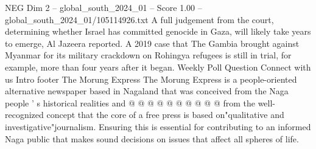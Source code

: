 \begin{textsample}{NEG Dim 2 – global\_south\_2024\_01 – Score 1.00 – global\_south\_2024\_01/105114926.txt}
A full judgement from the court, determining whether Israel has committed genocide in Gaza, will likely take years to emerge, Al Jazeera reported.
A 2019 case that The Gambia brought against Myanmar for its military crackdown on Rohingya refugees is still in trial, for example, more than four years after it began.
Weekly Poll Question Connect with us Intro footer The Morung Express The Morung Express is a people-oriented alternative newspaper based in Nagaland that was conceived from the Naga people ' s historical realities and @ @ @ @ @ @ @ @ @ @ from the well-recognized concept that the core of a free press is based on"qualitative and investigative"journalism.
Ensuring this is essential for contributing to an informed Naga public that makes sound decisions on issues that affect all spheres of life.

\end{textsample}
